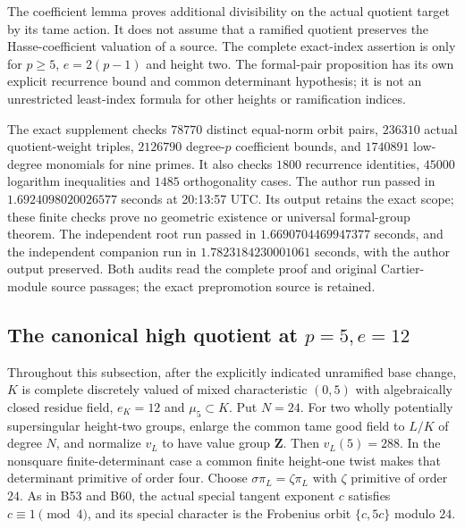 \begin{remark}
\label{rem:B-RD64-scope}
The coefficient lemma proves additional divisibility on the
actual quotient target by its tame action. It does not assume
that a ramified quotient preserves the Hasse-coefficient
valuation of a source. The complete exact-index assertion is
only for $p\ge5$, $e=2(p-1)$ and height two. The formal-pair
proposition has its own explicit recurrence bound and common
determinant hypothesis; it is not an unrestricted least-index
formula for other heights or ramification indices.

The exact supplement
checks $78770$ distinct equal-norm orbit pairs, $236310$ actual
quotient-weight triples, $2126790$ degree-$p$ coefficient bounds,
and $1740891$ low-degree monomials for nine primes. It also checks
$1800$ recurrence identities, $45000$ logarithm inequalities and
$1485$ orthogonality cases. The author run passed in
$1.6924098020026577$ seconds at 20:13:57 UTC. Its output retains
the exact scope; these finite checks prove no geometric existence
or universal formal-group theorem. The independent root run passed in
$1.6690704469947377$ seconds, and the independent companion run in
$1.7823184230001061$ seconds, with the author output preserved.
Both audits read the complete proof and original Cartier-module
source passages; the exact prepromotion source is retained.
\end{remark}


\subsection{The canonical high quotient at \(p=5,e=12\)}

Throughout this subsection, after the explicitly indicated unramified
base change, $K$ is complete discretely valued of mixed characteristic
$(0,5)$ with algebraically closed residue field, $e_K=12$ and
$\mu_5\subset K$. Put $N=24$. For two wholly potentially supersingular
height-two groups, enlarge the common tame good field to $L/K$ of degree
$N$, and normalize $v_L$ to have value group $\mathbf Z$.
Then $v_L(5)=288$. In the nonsquare finite-determinant case a common
finite height-one twist makes that determinant primitive of order four.
Choose $\sigma\pi_L=\zeta\pi_L$ with $\zeta$ primitive of order $24$.
As in B53 and B60, the actual special tangent exponent $c$ satisfies
$c\equiv1\pmod4$, and its special character is the Frobenius orbit
$\{c,5c\}$ modulo $24$.

